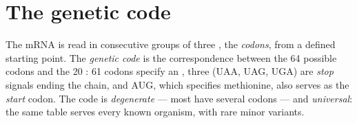\section{The genetic code}

\begin{definition}\label{def:g11:gene-expression:code}
The mRNA is read in consecutive groups of three , the
\emph{codons}, from a defined starting point. The
\emph{genetic code} is the correspondence between
the 64 possible codons and the 20 : 61 codons specify an
, three (UAA, UAG, UGA) are \emph{stop} signals ending the
chain, and AUG, which specifies methionine, also serves as the
\emph{start} codon. The code is \emph{degenerate} --- most 
have several codons --- and \emph{universal}: the same table serves
every known organism, with rare minor variants.
\end{definition}


